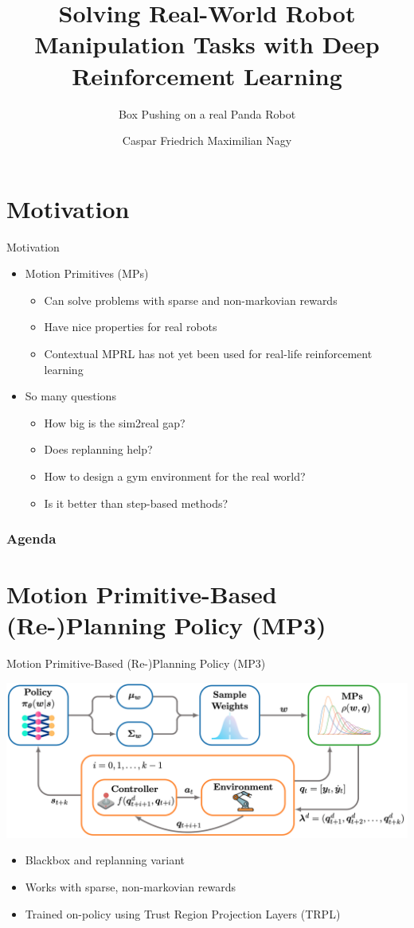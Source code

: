 \documentclass[16:9,en,navbarinfooter]{sdqbeamer}
\author{Caspar Friedrich Maximilian Nagy}
\title{Solving Real-World Robot Manipulation Tasks with Deep Reinforcement Learning}
\subtitle{Box Pushing on a real Panda Robot}
\begin{document}
\KITtitleframe{}


\section{Motivation}
\begin{frame}{Motivation}
\begin{itemize}
    \item Motion Primitives (MPs)
   \begin{itemize}
       \item Can solve problems with sparse and non-markovian rewards
       \item Have nice properties for real robots
       \item Contextual MPRL has not yet been used for real-life reinforcement learning
   \end{itemize}
   \item So many questions
   \begin{itemize}
           \item How big is the sim2real gap? 
           \item Does replanning help?
           \item How to design a gym environment for the real world?
           \item Is it better than step-based methods?
   \end{itemize}
\end{itemize}

\end{frame}

\begin{frame}
\frametitle{Agenda}
    \vspace{.5cm}
\tableofcontents
\end{frame}

\section{Motion Primitive-Based (Re-)Planning Policy (MP3)}
\begin{frame}{Motion Primitive-Based (Re-)Planning Policy (MP3)}

\center 
    \vspace{1cm}
\includegraphics[width=.7\linewidth]{media/mp3.png}
\begin{itemize}
\item Blackbox and replanning variant
\item Works with sparse, non-markovian rewards
\item Trained on-policy using Trust Region Projection Layers (TRPL)
\end{itemize}
\end{frame}
\end{document}
